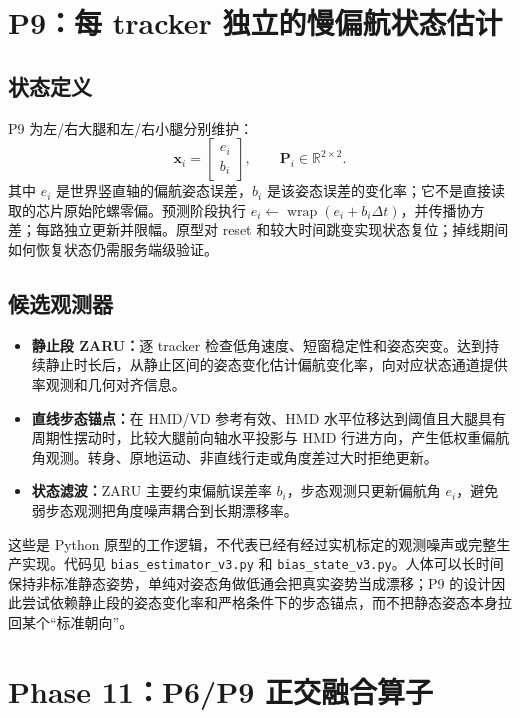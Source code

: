 \documentclass[UTF8,11pt,a4paper]{ctexart}
\begin{document}
\section{P9：每 tracker 独立的慢偏航状态估计}

\subsection{状态定义}
P9 为左/右大腿和左/右小腿分别维护：
\[
\mathbf{x}_i =
\begin{bmatrix} e_i \\ b_i \end{bmatrix},
\qquad \mathbf{P}_i\in\mathbb{R}^{2\times2}.
\]
其中 \(e_i\) 是世界竖直轴的偏航姿态误差，\(b_i\) 是该姿态误差的变化率；它不是直接读取的芯片原始陀螺零偏。预测阶段执行 \(e_i\leftarrow\operatorname{wrap}(e_i+b_i\Delta t)\)，并传播协方差；每路独立更新并限幅。原型对 reset 和较大时间跳变实现状态复位；掉线期间如何恢复状态仍需服务端级验证。

\subsection{候选观测器}
\begin{itemize}
  \item \textbf{静止段 ZARU：}逐 tracker 检查低角速度、短窗稳定性和姿态突变。达到持续静止时长后，从静止区间的姿态变化估计偏航变化率，向对应状态通道提供率观测和几何对齐信息。
  \item \textbf{直线步态锚点：}在 HMD/VD 参考有效、HMD 水平位移达到阈值且大腿具有周期性摆动时，比较大腿前向轴水平投影与 HMD 行进方向，产生低权重偏航角观测。转身、原地运动、非直线行走或角度差过大时拒绝更新。
  \item \textbf{状态滤波：}ZARU 主要约束偏航误差率 \(b_i\)，步态观测只更新偏航角 \(e_i\)，避免弱步态观测把角度噪声耦合到长期漂移率。
\end{itemize}
这些是 Python 原型的工作逻辑，不代表已经有经过实机标定的观测噪声或完整生产实现。代码见 \texttt{bias\_estimator\_v3.py} 和 \texttt{bias\_state\_v3.py}。人体可以长时间保持非标准静态姿势，单纯对姿态角做低通会把真实姿势当成漂移；P9 的设计因此尝试依赖静止段的姿态变化率和严格条件下的步态锚点，而不把静态姿态本身拉回某个“标准朝向”。

\section{Phase 11：P6/P9 正交融合算子}
\end{document}
